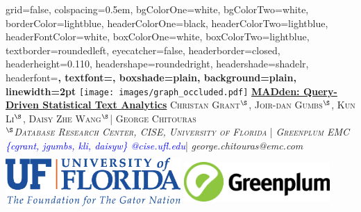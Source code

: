 \documentclass[landscape,final,a0paper,fontscale=0.285]{baposter}
\begin{document}
		\begin{poster}%
		  {
		  grid=false,
		  colspacing=0.5em,
		  bgColorOne=white,
		  bgColorTwo=white,
		  borderColor=lightblue,
		  headerColorOne=black,
		  headerColorTwo=lightblue,
		  headerFontColor=white,
		  boxColorOne=white,
		  boxColorTwo=lightblue,
		  textborder=roundedleft,
		  eyecatcher=false,
		  headerborder=closed,
		  headerheight=0.110\textheight,
		  headershape=roundedright,
		  headershade=shadelr,
		  headerfont=\Large\bf\textsc, %
		  textfont={\setlength{\parindent}{1.2em}},
		  boxshade=plain,
		  background=plain,
		  linewidth=2pt
		  }
		  {\texttt{[image: images/graph\_occluded.pdf]}} 
		  {\vspace*{2pt}\bf{\underline{MADden: Query-Driven Statistical Text Analytics}}\vspace{-0.10em}}
		  {\textsc{ Christan Grant$^{\S}$, Joir-dan Gumbs$^{\S}$, Kun Li$^{\S}$, Daisy Zhe Wang$^{\S}$| George Chitouras\\    
		                    {$^{\S}$\textit{Database Research Center, CISE, University of Florida} | \textit{Greenplum EMC} }}\\
		             {\textit{\textcolor{blue} {\{cgrant, jgumbs, kli, daisyw\} @cise.ufl.edu}}| \textit{george.chitouras@emc.com}  }}
		  {%
		    \includegraphics[height=6.0em, width=18.0em]{logo/UF_Signature_Themeline.pdf}
		    \includegraphics[height=6.0em, width=15.0em]{logo/gp_logo.jpg}
		  }\vspace{-3mm}
		

\end{poster}
\end{document}
